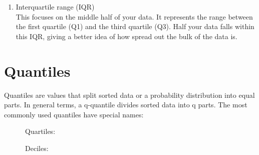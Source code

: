 \documentclass[
]{book}
\newenvironment{Shaded}{\begin{snugshade}}{\end{snugshade}}
\newcommand{\AttributeTok}[1]{\textcolor[rgb]{0.13,0.29,0.53}{#1}}
\newcommand{\CommentTok}[1]{\textcolor[rgb]{0.56,0.35,0.01}{\textit{#1}}}
\newcommand{\DecValTok}[1]{\textcolor[rgb]{0.00,0.00,0.81}{#1}}
\newcommand{\FloatTok}[1]{\textcolor[rgb]{0.00,0.00,0.81}{#1}}
\newcommand{\FunctionTok}[1]{\textcolor[rgb]{0.13,0.29,0.53}{\textbf{#1}}}
\newcommand{\NormalTok}[1]{#1}
\newcommand{\SpecialCharTok}[1]{\textcolor[rgb]{0.81,0.36,0.00}{\textbf{#1}}}
\newcommand{\StringTok}[1]{\textcolor[rgb]{0.31,0.60,0.02}{#1}}
\providecommand{\tightlist}{%
  \setlength{\itemsep}{0pt}\setlength{\parskip}{0pt}}
\begin{document}
\begin{enumerate}
\def\labelenumi{\arabic{enumi}.}
\setcounter{enumi}{3}
\tightlist
\item
  Interquartile range (IQR)\\
  This focuses on the middle half of your data. It represents the range between the first quartile (Q1) and the third quartile (Q3). Half your data falls within this IQR, giving a better idea of how spread out the bulk of the data is.
\end{enumerate}

\begin{Shaded}
\end{Shaded}

\hypertarget{quantiles}{%
\section{Quantiles}\label{quantiles}}

Quantiles are values that split sorted data or a probability distribution into equal parts. In general terms, a q-quantile divides sorted data into q parts. The most commonly used quantiles have special names:

~~~~~~Quartiles:

\begin{Shaded}
\end{Shaded}

~~~~~~Deciles:

\begin{Shaded}
\end{Shaded}
\end{document}
